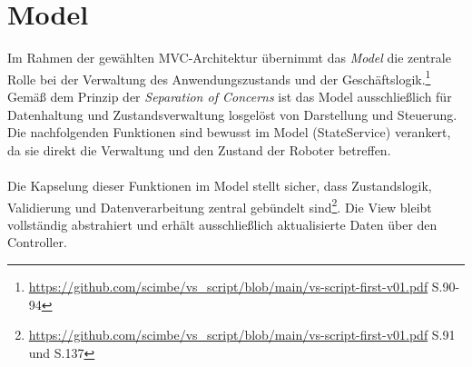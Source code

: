 \clearpage

\section{Model}
Im Rahmen der gewählten MVC-Architektur übernimmt das \textit{Model} die zentrale Rolle bei der Verwaltung des Anwendungszustands und der Geschäftslogik.\footnote{\url{https://github.com/scimbe/vs_script/blob/main/vs-script-first-v01.pdf} S.90-94}
Gemäß dem Prinzip der \textit{Separation of Concerns} ist das Model ausschließlich für Datenhaltung und Zustandsverwaltung losgelöst von Darstellung und Steuerung. 
Die nachfolgenden Funktionen sind bewusst im Model (StateService) verankert, da sie direkt die Verwaltung und den Zustand der Roboter betreffen.
\\\\%
Die Kapselung dieser Funktionen im Model stellt sicher, dass Zustandslogik, Validierung und Datenverarbeitung zentral gebündelt sind\footnote{\url{https://github.com/scimbe/vs_script/blob/main/vs-script-first-v01.pdf} S.91 und S.137}.
Die View bleibt vollständig abstrahiert und erhält ausschließlich aktualisierte Daten über den Controller. 


